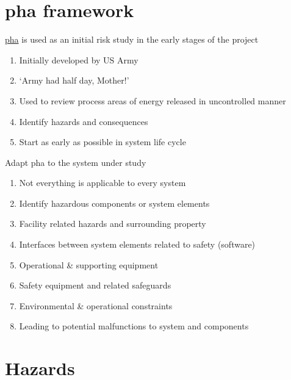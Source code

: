 \documentclass[aspectratio=1610,pdftex,dvipsnames,compress,xcolor={dvipsnames}]{beamer}
\newcommand{\acs}{\acrshort} %
\begin{document}
\section{\acs{pha} framework}


\addtocounter{framenumber}{-1}
\begin{frame}{\href{https://uidaho.pressbooks.pub/riskassessment/chapter/preliminary-hazards-analysis/}{\acs{pha}} is used as an initial risk study in the early stages of the project}
    \begin{enumerate}[series=outerlist,topsep=0pt,itemsep=21pt,leftmargin=*,label=(\arabic*)]
        \item[]Initially developed by US Army
        \item[]`Army had half day, Mother!'
        \item[]Used to review process areas of energy released in uncontrolled manner
        \item[]Identify hazards and consequences
        \item[]Start as early as possible in system life cycle
    \end{enumerate}
\end{frame}


\begin{frame}{Adapt \acs{pha} to the system under study}
    \begin{enumerate}[series=outerlist,topsep=0pt,itemsep=7pt,leftmargin=*,label=(\arabic*)]
        \item[]Not everything is applicable to every system
        \item[]Identify hazardous components or system elements
        \item[]Facility related hazards and surrounding property
        \item[]Interfaces between system elements related to safety (software)
        \item[]Operational \& supporting equipment  
        \item[]Safety equipment and related safeguards
        \item[]Environmental \& operational constraints  
        \item[]Leading to potential malfunctions to system and components
    \end{enumerate}
\end{frame}


\section{Hazards}
\end{document}
